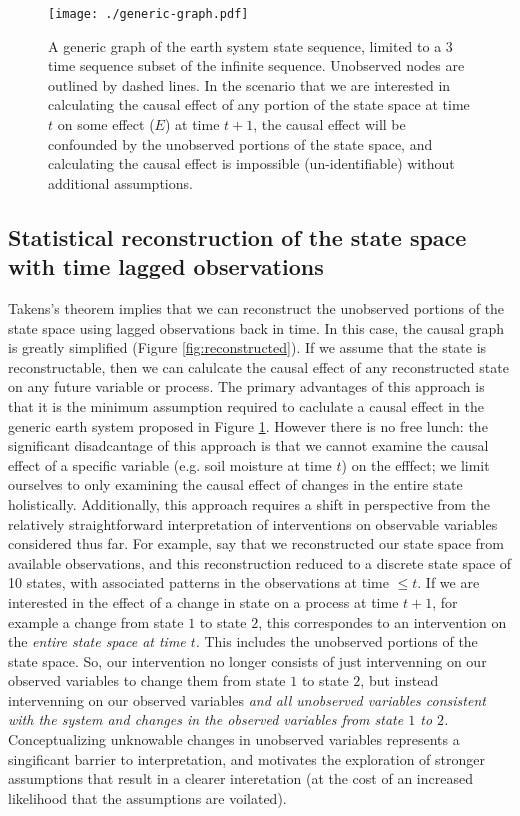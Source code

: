 \documentclass[12pt]{article}
\begin{document}
\begin{figure}
  \texttt{[image: ./generic-graph.pdf]}
  \caption{A generic graph of the earth system state sequence, limited
    to a 3 time sequence subset of the infinite sequence. Unobserved
    nodes are outlined by dashed lines.  In the scenario that we are
    interested in calculating the causal effect of any portion of the
    state space at time $t$ on some effect ($E$) at time $t+1$, the
    causal effect will be confounded by the unobserved portions of the
    state space, and calculating the causal effect is impossible
    (un-identifiable) without additional assumptions.}
  \label{fig:generic}
\end{figure}

\subsection{Statistical reconstruction of the state space with time
  lagged observations}
\label{sec:stat-reconstr-state}

Takens's theorem implies that we can reconstruct the unobserved
portions of the state space using lagged observations back in time. In
this case, the causal graph is greatly simplified (Figure
\ref{fig:reconstructed}). If we assume that the state is
reconstructable, then we can calulcate the causal effect of any
reconstructed state on any future variable or process. The primary
advantages of this approach is that it is the minimum assumption
required to caclulate a causal effect in the generic earth system
proposed in Figure \ref{fig:generic}. However there is no free lunch:
the significant disadcantage of this approach is that we cannot
examine the causal effect of a specific variable (e.g. soil moisture
at time $t$) on the efffect; we limit ourselves to only examining the
causal effect of changes in the entire state
holistically. Additionally, this approach requires a shift in
perspective from the relatively straightforward interpretation of
interventions on observable variables considered thus far. For
example, say that we reconstructed our state space from available
observations, and this reconstruction reduced to a discrete state
space of 10 states, with associated patterns in the observations at
time $\leq t$. If we are interested in the effect of a change in state on
a process at time $t+1$, for example a change from state $1$ to state
$2$, this correspondes to an intervention on the \textit{entire state
  space at time $t$}. This includes the unobserved portions of the
state space. So, our intervention no longer consists of just
intervenning on our observed variables to change them from state $1$
to state $2$, but instead intervenning on our observed variables
\emph{and all unobserved variables consistent with the system and
  changes in the observed variables from state $1$ to $2$.}
Conceptualizing unknowable changes in unobserved variables represents
a singificant barrier to interpretation, and motivates the exploration
of stronger assumptions that result in a clearer interetation (at the
cost of an increased likelihood that the assumptions are voilated).
\end{document}
